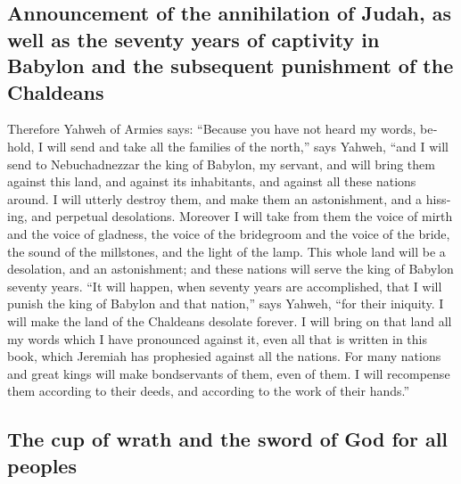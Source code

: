 \begin{paracol}{2}
\begin{otherlanguage}{english}
\hypertarget{announcement-of-the-annihilation-of-judah-as-well-as-the-seventy-years-of-captivity-in-babylon-and-the-subsequent-punishment-of-the-chaldeans}{%
\subsection{Announcement of the annihilation of Judah, as well as the
seventy years of captivity in Babylon and the subsequent punishment of
the
Chaldeans}\label{announcement-of-the-annihilation-of-judah-as-well-as-the-seventy-years-of-captivity-in-babylon-and-the-subsequent-punishment-of-the-chaldeans}}

 Therefore Yahweh of Armies says: ``Because you have not
heard my words,  behold, I will send and take all the
families of the north,'' says Yahweh, ``and I will send to
Nebuchadnezzar the king of Babylon, my servant, and will bring them
against this land, and against its inhabitants, and against all these
nations around. I will utterly destroy them, and make them an
astonishment, and a hissing, and perpetual desolations. 
Moreover I will take from them the voice of mirth and the voice of
gladness, the voice of the bridegroom and the voice of the bride, the
sound of the millstones, and the light of the lamp.  This
whole land will be a desolation, and an astonishment; and these nations
will serve the king of Babylon seventy years.  ``It will
happen, when seventy years are accomplished, that I will punish the king
of Babylon and that nation,'' says Yahweh, ``for their iniquity. I will
make the land of the Chaldeans desolate forever.  I will
bring on that land all my words which I have pronounced against it, even
all that is written in this book, which Jeremiah has prophesied against
all the nations.  For many nations and great kings will
make bondservants of them, even of them. I will recompense them
according to their deeds, and according to the work of their hands.''

\hypertarget{the-cup-of-wrath-and-the-sword-of-god-for-all-peoples}{%
\subsection{The cup of wrath and the sword of God for all
peoples}\label{the-cup-of-wrath-and-the-sword-of-god-for-all-peoples}}


\end{otherlanguage}
\end{paracol}
